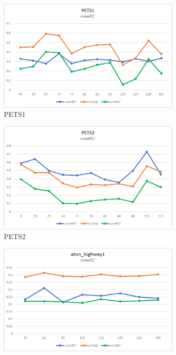 \begin{appendices}
\clearpage
\FloatBarrier
\begin{figure}
  \begin{subfigure}{.45\linewidth}
  \includegraphics[width=1\linewidth]{figures/appendix/pets1_prime.jpg}
  \caption{PETS1}
\end{subfigure}
\hfill
\begin{subfigure}{.45\linewidth}
  \includegraphics[width=1\linewidth]{figures/appendix/pets2_prime.jpg}
  \caption{PETS2}
\end{subfigure}
\hfill
\begin{subfigure}{.45\linewidth}
  \includegraphics[width=1\linewidth]{figures/appendix/highway1_prime.jpg}

\end{subfigure}
\end{figure}
\end{appendices}
